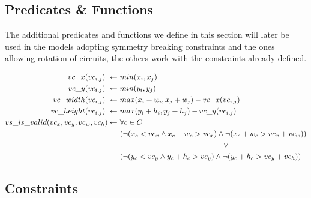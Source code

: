 
\subsection{Predicates \& Functions}
    The additional predicates and functions we define in this section will later be used in the models
    adopting symmetry breaking constraints and the ones allowing rotation of circuits, the others work 
    with the constraints already defined.

    \begin{align}
        vc\_x(vc_{i,j})\                        \leftarrow\ & min(x_i, x_j)                                 \\
        vc\_y(vc_{i,j})\                        \leftarrow\ & min(y_i, y_j)                                 \\
        vc\_width(vc_{i,j})\                    \leftarrow\ & max(x_i + w_i, x_j + w_j) - vc\_x(vc_{i,j})   \\
        vc\_height(vc_{i,j})\                   \leftarrow\ & max(y_i + h_i, y_j + h_j) - vc\_y(vc_{i,j})   \\
        vs\_is\_valid(vc_x, vc_y, vc_w, vc_h)   \leftarrow\ & \forall c \in C                               \\
                                                            & (\neg(x_c < vc_x \land x_c + w_c > vc_x) \land
                                                               \neg(x_c + w_c > vc_x + vc_w)) \nonumber     \\
                                                            &\ \hspace{4.7cm} \lor \nonumber                \\
                                                            & (\neg(y_c < vc_y \land y_c + h_c > vc_y) \land
                                                               \neg(y_c + h_c > vc_y + vc_h)) \nonumber
    \end{align}




\subsection{Constraints}
